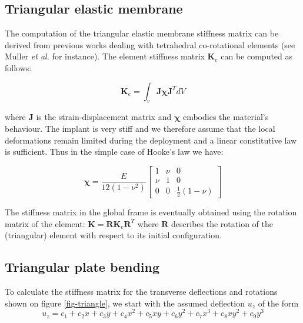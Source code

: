\documentclass{llncs}
\begin{document}
\subsection{Triangular elastic membrane}

The computation of the triangular elastic membrane stiffness matrix can be derived from previous works dealing with tetrahedral co-rotational elements (see Muller \emph{et al.} \cite{Muller04} for instance). The element stiffness matrix $\textbf{K}_e$ can be computed as follows:

\begin{equation}
\textbf{K}_e = \int_v \textbf{J} \boldsymbol\chi \textbf{J}^{T} dV
\end{equation}

where $\textbf{J}$ is the strain-displacement matrix and $\boldsymbol\chi$ embodies the material's behaviour. The implant is very stiff and we therefore assume that the local deformations remain limited during the deployment and a linear constitutive law is sufficient. Thus in the simple case of Hooke's law we have:

\begin{equation}
\boldsymbol\chi = \frac{E}{12(1-\nu^2)}
\begin{bmatrix}
1 & \nu & 0 \\
\nu & 1 & 0 \\
0 & 0 & \frac{1}{2} (1-\nu)
\end{bmatrix}
\end{equation}

The stiffness matrix in the global frame is eventually obtained using the rotation matrix of the element: $\textbf{K} = \textbf{R} \textbf{K}_e \textbf{R}^{T}$ where $\textbf{R}$ describes the rotation of the (triangular) element with respect to its initial configuration.

\subsection{Triangular plate bending}

To calculate the stiffness matrix for the transverse deflections and rotations shown on figure \ref{fig-triangle}, we start with the assumed deflection $u_z$ of the form
\begin{equation}
 u_z = c_1 + c_2x + c_3y + c_4x^2 + c_5xy + c_6y^2 + c_7x^3 + c_8xy^2 + c_9y^3
\label{eq-deflection}
\end{equation} 
\end{document}
